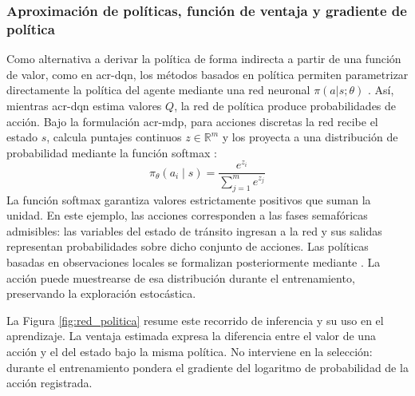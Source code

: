 \subsubsection{Aproximación de políticas, función de ventaja y gradiente de política}

\begingroup
{}
Como alternativa a derivar la política de forma indirecta a partir de una función de valor, como en \acrshort{acr-dqn}, los métodos basados en política permiten parametrizar directamente la política del agente mediante una red neuronal $\pi(a|s; \theta)$ \cite{marlbook}. Así, mientras \acrshort{acr-dqn} estima valores $Q$, la red de política produce probabilidades de acción. Bajo la formulación \acrshort{acr-mdp}, para acciones discretas la red recibe el estado $s$, calcula puntajes continuos $z \in \mathbb{R}^m$ y los proyecta a una distribución de probabilidad mediante la función \gls{softmax} \cite{suttonRL,bishop2024deep}:
\begin{equation}
    \pi_\theta(a_i \mid s) = \frac{e^{z_i}}{\sum_{j=1}^m e^{z_j}}
    \label{eq:softmax_policy}
\end{equation}
\endgroup
La función softmax garantiza valores estrictamente positivos que suman la unidad. En este ejemplo, las acciones corresponden a las fases semafóricas admisibles: las variables del estado de tránsito ingresan a la red y sus salidas representan probabilidades sobre dicho conjunto de acciones. Las políticas basadas en observaciones locales se formalizan posteriormente mediante . La acción puede muestrearse de esa distribución durante el entrenamiento, preservando la exploración estocástica.

La Figura \ref{fig:red_politica} resume este recorrido de inferencia y su uso en el aprendizaje. La ventaja estimada expresa la diferencia entre el valor de una acción y el del estado bajo la misma política. No interviene en la selección: durante el entrenamiento pondera el gradiente del logaritmo de probabilidad de la acción registrada.

